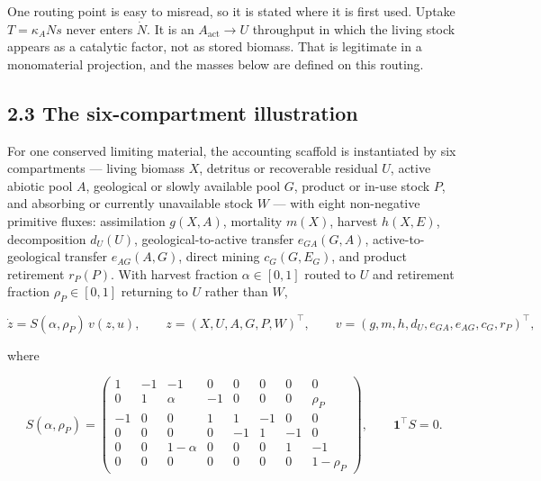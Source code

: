\documentclass[11pt]{article}
\begin{document}
One routing point is easy to misread, so it is stated where it is first used. Uptake \(T=\kappa_A Ns\) never enters \(\dot N\). It is an \(A_{\mathrm{act}}\to U\) throughput in which the living stock appears as a catalytic factor, not as stored biomass. That is legitimate in a monomaterial projection, and the masses below are defined on this routing.

\subsection*{2.3 The six-compartment illustration}\label{23-the-six-compartment-illustration}

For one conserved limiting material, the accounting scaffold is instantiated by six compartments --- living biomass \(X\), detritus or recoverable residual \(U\), active abiotic pool \(A\), geological or slowly available pool \(G\), product or in-use stock \(P\), and absorbing or currently unavailable stock \(W\) --- with eight non-negative primitive fluxes: assimilation \(g(X,A)\), mortality \(m(X)\), harvest \(h(X,E)\), decomposition \(d_U(U)\), geological-to-active transfer \(e_{GA}(G,A)\), active-to-geological transfer \(e_{AG}(A,G)\), direct mining \(c_G(G,E_G)\), and product retirement \(r_P(P)\). With harvest fraction \(\alpha \in [0,1]\) routed to \(U\) and retirement fraction \(\rho_P \in [0,1]\) returning to \(U\) rather than \(W\), 

$$\dot z = S(\alpha, \rho_P)\, v(z, u), \qquad z = (X, U, A, G, P, W)^\top, \qquad v = (g, m, h, d_U, e_{GA}, e_{AG}, c_G, r_P)^\top,$$

 where 

$$S(\alpha, \rho_P) = \begin{pmatrix} 1 & -1 & -1 & 0 & 0 & 0 & 0 & 0 \\ 0 & 1 & \alpha & -1 & 0 & 0 & 0 & \rho_P \\ -1 & 0 & 0 & 1 & 1 & -1 & 0 & 0 \\ 0 & 0 & 0 & 0 & -1 & 1 & -1 & 0 \\ 0 & 0 & 1-\alpha & 0 & 0 & 0 & 1 & -1 \\ 0 & 0 & 0 & 0 & 0 & 0 & 0 & 1-\rho_P \end{pmatrix}, \qquad \mathbf{1}^\top S = 0.$$
\end{document}
